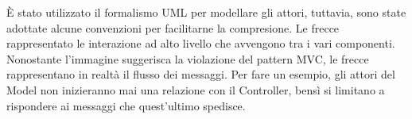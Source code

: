 È stato utilizzato il formalismo UML per modellare gli attori,
tuttavia, sono state adottate alcune convenzioni per facilitarne la compresione.
Le frecce rappresentato le interazione ad alto livello che avvengono tra i vari componenti.
Nonostante l'immagine  suggerisca la violazione del pattern MVC, le frecce rappresentano in realtà il flusso dei messaggi.
Per fare un esempio, gli attori del Model non inizieranno mai una relazione con il Controller,
bensì si limitano a rispondere ai messaggi che quest'ultimo spedisce.